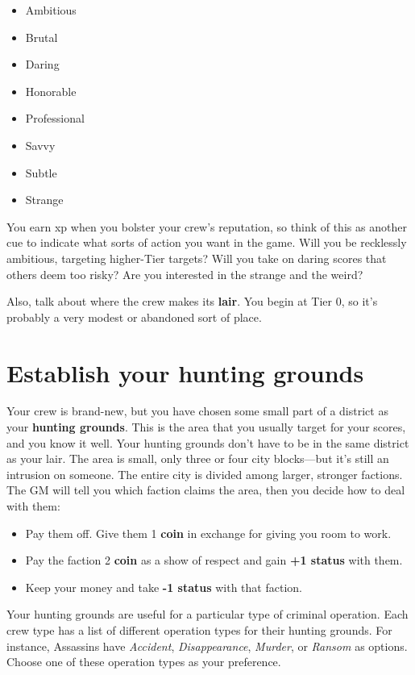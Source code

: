 \documentclass[11pt,fleqn,a5paper]{book}
\newcommand{\gameterm}[1]{\textbf{#1}}
\begin{document}
\begin{itemize}
	\item Ambitious
	\item Brutal
	\item Daring
	\item Honorable
	\item Professional
	\item Savvy
	\item Subtle
	\item Strange
\end{itemize}

You earn xp when you bolster your crew’s reputation, so think of this as another cue to indicate what sorts of action you want in the game. Will you be recklessly ambitious, targeting higher-Tier targets? Will you take on daring scores that others deem too risky? Are you interested in the strange and the weird?

Also, talk about where the crew makes its \textbf{lair}. You begin at Tier 0, so it’s probably a very modest or abandoned sort of place.

\section{Establish your hunting grounds}

Your crew is brand-new, but you have chosen some small part of a district as your \textbf{hunting grounds}. This is the area that you usually target for your scores, and you know it well. Your hunting grounds don’t have to be in the same district as your lair. The area is small, only three or four city blocks---but it’s still an intrusion on someone. The entire city is divided among larger, stronger factions. The GM will tell you which faction claims the area, then you decide how to deal with them:

\begin{itemize}
	\item Pay them off. Give them 1 \gameterm{coin}  in exchange for giving you room to work.
	\item Pay the faction 2 \gameterm{coin}  as a show of respect and gain \textbf{+1 status }with them.
	\item Keep your money and take \textbf{-1 status} with that faction.
\end{itemize}

Your hunting grounds are useful for a particular type of criminal operation. Each crew type has a list of different operation types for their hunting grounds. For instance, Assassins have \emph{Accident}, \emph{Disappearance}, \emph{Murder}, or \emph{Ransom} as options. Choose one of these operation types as your preference.
\end{document}
